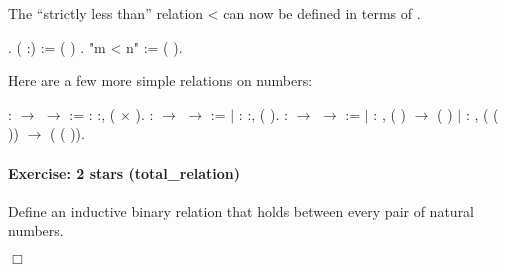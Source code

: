 \documentclass[12pt]{report}
\begin{document}
 The ``strictly less than'' relation  <  can now be defined
    in terms of . \begin{coqdoccode}
\coqdocemptyline
\coqdocnoindent
{} .\coqdoceol
\coqdocemptyline
\coqdocnoindent
{}  ( :) :=  ( ) .\coqdoceol
\coqdocemptyline
\coqdocnoindent
{} "m < n" := (  ).\coqdoceol
\coqdocemptyline
\end{coqdoccode}
Here are a few more simple relations on numbers: \begin{coqdoccode}
\coqdocemptyline
\coqdocnoindent
{}  :  \ensuremath{\rightarrow}  \ensuremath{\rightarrow}  :=\coqdoceol
\coqdocindent{1.00em}
 : \coqdockw{\ensuremath{\forall}} :,   ( \ensuremath{\times} ).\coqdoceol
\coqdocemptyline
\coqdocnoindent
{}  :  \ensuremath{\rightarrow}  \ensuremath{\rightarrow}  :=\coqdoceol
\coqdocindent{1.00em}
\ensuremath{|}  : \coqdockw{\ensuremath{\forall}} :,   ( ).\coqdoceol
\coqdocemptyline
\coqdocnoindent
{}  :  \ensuremath{\rightarrow}  \ensuremath{\rightarrow}  :=\coqdoceol
\coqdocindent{1.00em}
\ensuremath{|}  : \coqdockw{\ensuremath{\forall}} ,  ( ) \ensuremath{\rightarrow}   ( )\coqdoceol
\coqdocindent{1.00em}
\ensuremath{|}  : \coqdockw{\ensuremath{\forall}} ,  ( ( )) \ensuremath{\rightarrow}   ( ( )).\coqdoceol
\coqdocemptyline
\end{coqdoccode}
\paragraph{Exercise: 2 stars (total\_relation)}

 Define an inductive binary relation  that holds
    between every pair of natural numbers. \begin{coqdoccode}
\coqdocemptyline
\end{coqdoccode}
\ensuremath{\Box} 
\end{document}
